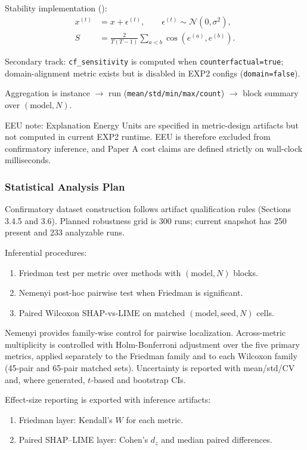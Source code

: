 \documentclass[twoside,11pt]{article}
\begin{document}
Stability implementation ():
\begin{align}
x^{(t)} &= x + \epsilon^{(t)},\qquad \epsilon^{(t)}\sim\mathcal{N}(0,\sigma^2),\\
S &= \frac{2}{T(T-1)}\sum_{a<b}\cos\left(e^{(a)},e^{(b)}\right).
\end{align}

Secondary track: \texttt{cf\_sensitivity} is computed when
\texttt{counterfactual=true}; domain-alignment metric exists but is disabled in
EXP2 configs (\texttt{domain=false}).

Aggregation is instance $\rightarrow$ run (\texttt{mean/std/min/max/count})
$\rightarrow$ block summary over $(\text{model},N)$.

EEU note: Explanation Energy Units are specified in metric-design artifacts but
not computed in current EXP2 runtime.
EEU is therefore excluded from confirmatory inference, and Paper A cost claims
are defined strictly on wall-clock milliseconds.

\subsubsection{Statistical Analysis Plan}
Confirmatory dataset construction follows artifact qualification rules (Sections
3.4.5 and 3.6). Planned robustness grid is 300 runs; current snapshot has 250
present and 233 analyzable runs.

Inferential procedures:
\begin{enumerate}[leftmargin=*]
    \item Friedman test per metric over methods with $(\text{model},N)$ blocks.
    \item Nemenyi post-hoc pairwise test when Friedman is significant.
    \item Paired Wilcoxon SHAP-vs-LIME on matched $(\text{model},\text{seed},N)$ cells.
\end{enumerate}
Nemenyi provides family-wise control for pairwise localization. Across-metric
multiplicity is controlled with Holm-Bonferroni adjustment over the five
primary metrics, applied separately to the Friedman family and to each Wilcoxon
family (45-pair and 65-pair matched sets). Uncertainty is reported with
mean/std/CV and, where generated, $t$-based and bootstrap CIs.

Effect-size reporting is exported with inference artifacts:
\begin{enumerate}[leftmargin=*]
    \item Friedman layer: Kendall's $W$ for each metric.
    \item Paired SHAP--LIME layer: Cohen's $d_z$ and median paired differences.
\end{enumerate}
\end{document}
